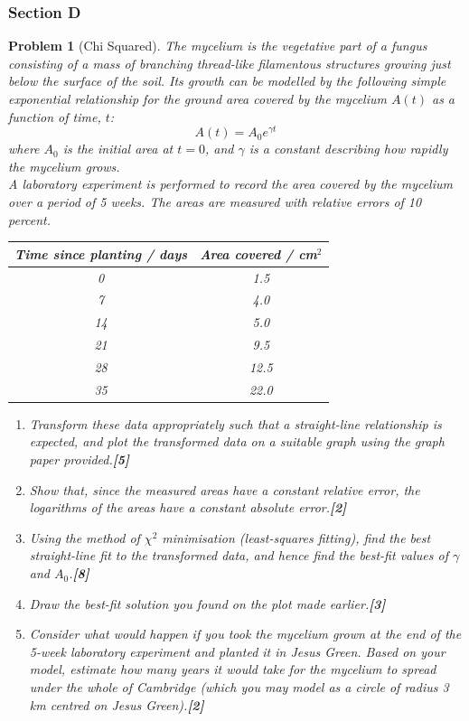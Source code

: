 \documentclass[a4paper]{article}
\theoremstyle{new}
\newtheorem{qns}{Problem}[subsection]
\begin{document}
\subsubsection{Section D}
\begin{qns}[Chi Squared]
The mycelium is the vegetative part of a fungus consisting of a mass of branching thread-like filamentous structures growing just below the surface of the soil. Its growth can be modelled by the following simple exponential relationship for the ground area covered by the mycelium $A(t)$ as a function of time, $t$:
$$A(t)=A_0e^{\gamma t}$$
where $A_0$ is the initial area at $t = 0$, and $\gamma$ is a constant describing how rapidly the mycelium grows.\\[5pt]
A laboratory experiment is performed to record the area covered by the mycelium over a period of 5 weeks. The areas are measured with relative errors of 10 percent.
\begin{center}
\begin{tabular}{ c | c}
Time since planting / days & Area covered / cm$^2$\\
\hline
0 & 1.5\\
7 & 4.0\\
14 & 5.0\\
21 & 9.5\\
28 & 12.5\\
35 & 22.0
\end{tabular}
\end{center}
\begin{enumerate}[label=(\roman*)]
\item Transform these data appropriately such that a straight-line relationship is expected, and plot the transformed data on a suitable graph using the graph paper provided.\hfill\textbf{[5]}
\item Show that, since the measured areas have a constant relative error, the logarithms of the areas have a constant absolute error.\hfill\textbf{[2]}
\item Using the method of $\chi^2$ minimisation (least-squares fitting), find the best straight-line fit to the transformed data, and hence find the best-fit values of $\gamma$ and $A_0$.\hfill\textbf{[8]}
\item Draw the best-fit solution you found on the plot made earlier.\hfill\textbf{[3]}
\item Consider what would happen if you took the mycelium grown at the end of the 5-week laboratory experiment and planted it in Jesus Green. Based on your model, estimate how many years it would take for the mycelium to spread under the whole of Cambridge (which you may model as a circle of radius 3 km centred on Jesus Green).\hfill\textbf{[2]}
\end{enumerate}
\end{qns}
\end{document}
